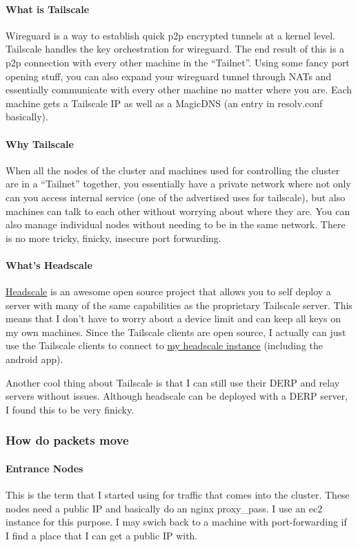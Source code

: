 \documentclass[12pt]{article}
\begin{document}
\paragraph{What is Tailscale}Wireguard is a way to establish quick p2p encrypted tunnels at a kernel level. Tailscale handles the key orchestration for wireguard. The end result of this is a p2p connection with every other machine in the ``Tailnet''. Using some fancy port opening stuff, you can also expand your wireguard tunnel through NATs and essentially communicate with every other machine no matter where you are. Each machine gets a Tailscale IP as well as a MagicDNS (an entry in resolv.conf basically).

\paragraph{Why Tailscale}
When all the nodes of the cluster and machines used for controlling the cluster are in a ``Tailnet'' together, you essentially have a private network where not only can you access internal service (one of the advertised uses for tailscale), but also machines can talk to each other without worrying about where they are. You can also manage individual nodes without needing to be in the same network. There is no more tricky, finicky, insecure port forwarding.

\paragraph{What's Headscale}
\label{sec:Headscale}
\href{https://github.com/juanfont/headscale}{Headscale} is an awesome open source project that allows you to self deploy a server with many of the same capabilities as the proprietary Tailscale server. This means that I don't have to worry about a device limit and can keep all keys on my own machines. Since the Tailscale clients are open source, I actually can just use the Tailscale clients to connect to \href{https://tunnel.sachiniyer.com}{my headscale instance} (including the android app).

Another cool thing about Tailscale is that I can still use their DERP and relay servers without issues. Although headscale can be deployed with a DERP server, I found this to be very finicky.

\subsubsection{How do packets move}
\paragraph{Entrance Nodes}
This is the term that I started using for traffic that comes into the cluster. These nodes need a public IP and basically do an nginx proxy\_pass. I use an ec2 instance for this purpose. I may swich back to a machine with port-forwarding if I find a place that I can get a public IP with.
\end{document}
